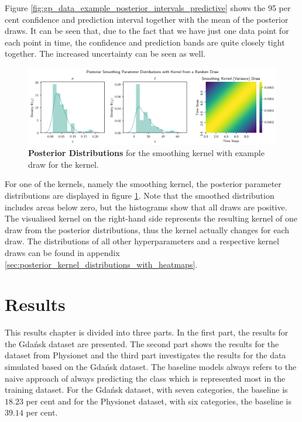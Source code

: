 \documentclass[11pt]{scrartcl}
\begin{document}
Figure \ref{fig:gp_data_example_posterior_intervals_predictive} shows the 95 per cent confidence and prediction interval together with the mean of the posterior draws. It can be seen that, due to the fact that we have just one data point for each point in time, the confidence and prediction bands are quite closely tight together. The increased uncertainty can be seen as well.


\begin{figure}[hbt]
	\centering
	\includegraphics[width=1.2\textwidth,center]{img/gp/gp_kernel_posterior_smoothing_zoomed.png}
	\caption{\textcolor{viridis5}{\textbf{Posterior Distributions}} for the smoothing kernel with example draw for the kernel.}
	\label{fig:gp_kernel_posterior_smoothing}
\end{figure}

For one of the kernels, namely the smoothing kernel, the posterior parameter distributions are displayed in figure \ref{fig:gp_kernel_posterior_smoothing}. Note that the smoothed distribution includes areas below zero, but the histograms show that all draws are positive. The visualised kernel on the right-hand side represents the resulting kernel of one draw from the posterior distributions, thus the kernel actually changes for each draw. The distributions of all other hyperparameters and a respective kernel draws can be found in appendix \ref{sec:posterior_kernel_distributions_with_heatmaps}.

\clearpage
\FloatBarrier
\section{Results}

This results chapter is divided into three parts. In the first part, the results for the Gdańsk dataset are presented. The second part shows the results for the dataset from Physionet and the third part investigates the results for the data simulated based on the Gdańsk dataset. The baseline models always refers to the naive approach of always predicting the class which is represented most in the training dataset. For the Gdańsk dataset, with seven categories, the baseline is $18.23$ per cent and for the Physionet dataset, with six categories, the baseline is $39.14$ per cent.
\end{document}
